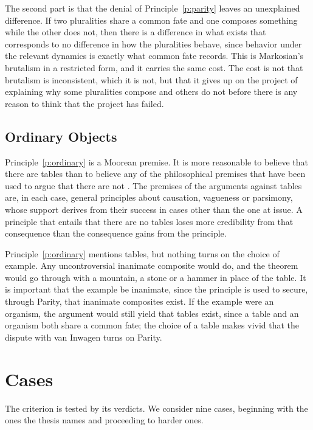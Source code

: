 \documentclass{situationist-preprint}
\begin{document}
The second part is that the denial of Principle~\ref{p:parity} leaves an unexplained difference. If two pluralities share a common fate and one composes something while the other does not, then there is a difference in what exists that corresponds to no difference in how the pluralities behave, since behavior under the relevant dynamics is exactly what common fate records. This is Markosian's brutalism in a restricted form, and it carries the same cost. The cost is not that brutalism is inconsistent, which it is not, but that it gives up on the project of explaining why some pluralities compose and others do not before there is any reason to think that the project has failed.

\subsection{Ordinary Objects}

Principle~\ref{p:ordinary} is a Moorean premise. It is more reasonable to believe that there are tables than to believe any of the philosophical premises that have been used to argue that there are not \citep{Korman2015}. The premises of the arguments against tables are, in each case, general principles about causation, vagueness or parsimony, whose support derives from their success in cases other than the one at issue. A principle that entails that there are no tables loses more credibility from that consequence than the consequence gains from the principle.

Principle~\ref{p:ordinary} mentions tables, but nothing turns on the choice of example. Any uncontroversial inanimate composite would do, and the theorem would go through with a mountain, a stone or a hammer in place of the table. It is important that the example be inanimate, since the principle is used to secure, through Parity, that inanimate composites exist. If the example were an organism, the argument would still yield that tables exist, since a table and an organism both share a common fate; the choice of a table makes vivid that the dispute with van Inwagen turns on Parity.

\section{Cases}

The criterion is tested by its verdicts. We consider nine cases, beginning with the ones the thesis names and proceeding to harder ones.
\end{document}
